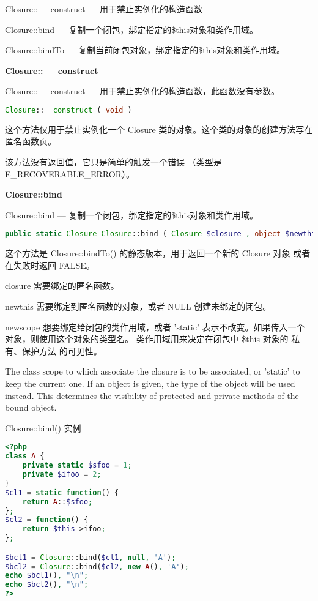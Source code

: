 \begin{compactitem}
\item Closure::\_\_construct — 用于禁止实例化的构造函数
\item Closure::bind — 复制一个闭包，绑定指定的\$this对象和类作用域。
\item Closure::bindTo — 复制当前闭包对象，绑定指定的\$this对象和类作用域。
\end{compactitem}


\textbf{Closure::\_\_construct}

Closure::\_\_construct — 用于禁止实例化的构造函数，此函数没有参数。

\begin{lstlisting}[language=PHP]
Closure::__construct ( void )
\end{lstlisting}

这个方法仅用于禁止实例化一个 Closure 类的对象。这个类的对象的创建方法写在匿名函数页。


该方法没有返回值，它只是简单的触发一个错误 （类型是 E\_RECOVERABLE\_ERROR）。

\textbf{Closure::bind}

Closure::bind — 复制一个闭包，绑定指定的\$this对象和类作用域。

\begin{lstlisting}[language=PHP]
public static Closure Closure::bind ( Closure $closure , object $newthis [, mixed $newscope = 'static' ] )
\end{lstlisting}

这个方法是 Closure::bindTo() 的静态版本，用于返回一个新的 Closure 对象 或者在失败时返回 FALSE。

\begin{compactitem}
\item closure
需要绑定的匿名函数。
\item newthis
需要绑定到匿名函数的对象，或者 NULL 创建未绑定的闭包。
\item newscope
想要绑定给闭包的类作用域，或者 'static' 表示不改变。如果传入一个对象，则使用这个对象的类型名。 类作用域用来决定在闭包中 \$this 对象的 私有、保护方法 的可见性。 

The class scope to which associate the closure is to be associated, or 'static' to keep the current one. If an object is given, the type of the object will be used instead. This determines the visibility of protected and private methods of the bound object.

\end{compactitem}

\begin{example}
Closure::bind() 实例
\begin{lstlisting}[language=PHP]
<?php
class A {
    private static $sfoo = 1;
    private $ifoo = 2;
}
$cl1 = static function() {
    return A::$sfoo;
};
$cl2 = function() {
    return $this->ifoo;
};

$bcl1 = Closure::bind($cl1, null, 'A');
$bcl2 = Closure::bind($cl2, new A(), 'A');
echo $bcl1(), "\n";
echo $bcl2(), "\n";
?>
\end{lstlisting}
\end{example}

